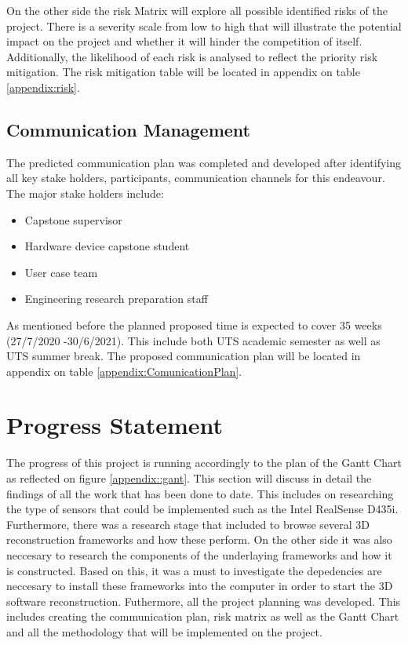 \documentclass[12pt]{report}
\begin{document}
On the other side the risk Matrix will explore all possible identified risks  of the  project. 
There is a severity scale from low to high that will illustrate the potential impact on the project and whether it will hinder the competition of itself.
 Additionally, the likelihood of each risk is analysed to reflect the priority risk mitigation. 
The risk mitigation table will be located in appendix on table \ref{appendix:risk}. 

\section{Communication Management}
The predicted communication plan was completed and developed after identifying all key stake holders, participants, communication channels for this endeavour. The major stake holders include:
\begin{itemize}
  \item Capstone supervisor
  \item Hardware device capstone student
  \item User case team
  \item Engineering research preparation staff
\end{itemize}
As mentioned before the planned proposed time is expected to cover 35 weeks (27/7/2020 -30/6/2021). This include both UTS academic semester as well as UTS summer break. 
The proposed communication plan will be located in appendix on table \ref{appendix:ComunicationPlan}. 



\chapter{Progress Statement}
The progress of this project is running accordingly to the plan of the Gantt Chart as reflected on figure \ref{appendix::gant}.
This section will discuss in detail the findings of all the work that has been done to date.
This includes on researching the type of sensors that could be implemented such as the Intel RealSense D435i. 
Furthermore, there was a research stage that included to browse several 3D reconstruction frameworks and how these perform. 
On the other side it was also neccesary to research the components of the underlaying frameworks and how it is constructed. Based on this, it was a must to investigate the depedencies 
are neccesary to install these frameworks into the computer in order to start the 3D software reconstruction. 
Futhermore, all the project planning was developed. This includes creating the communication plan, risk matrix as well as the Gantt Chart and all the methodology that will be implemented on the project. 
\end{document}
